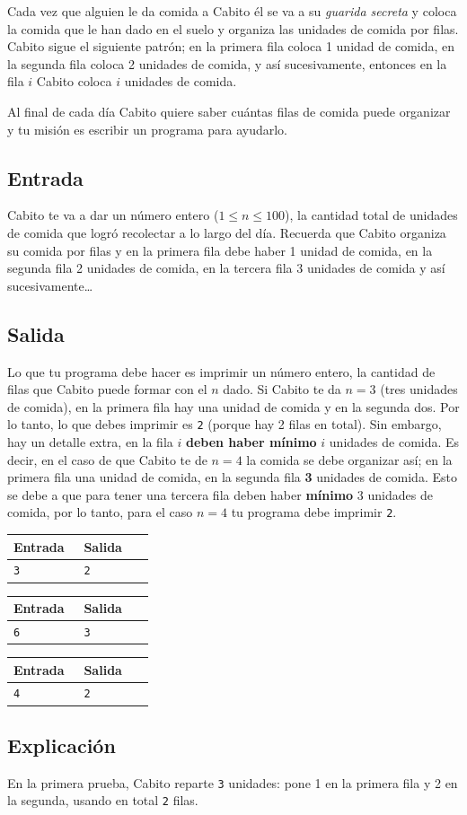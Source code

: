 \documentclass[10pt,letterpaper]{article}
\newcommand{\inputsection}{
  \subsection*{Entrada}
}
\newcommand{\outputsection}{
  \subsection*{Salida}
}
\newcommand{\explanation}{
  \subsection*{Explicación}
}
\newenvironment{sample}[2]{
  \begin{tcolorbox}[title=Prueba \##1, colback=white, colframe=black, sharp corners,
    fonttitle=\bfseries, breakable]
    \begin{tabular}{|p{0.45\linewidth}|p{0.45\linewidth}|}
      \hline
      \textbf{Entrada} & \textbf{Salida} \\
      \hline
      }{\\ \hline
    \end{tabular}
  \end{tcolorbox}
}
\begin{document}
Cada vez que alguien le da comida a Cabito él se va a su \textit{guarida secreta} y coloca la comida que le han dado en el suelo y organiza las unidades de comida por filas. Cabito sigue el siguiente patrón; en la primera fila coloca 1 unidad de comida, en la segunda fila coloca 2 unidades de comida, y así sucesivamente, entonces en la fila \(i\) Cabito coloca \(i\) unidades de comida.

Al final de cada día Cabito quiere saber cuántas filas de comida puede organizar y tu misión es escribir un programa para ayudarlo.

\inputsection

Cabito te va a dar un número entero (\(1 \leq n \leq 100\)), la cantidad total de unidades de comida que logró recolectar a lo largo del día. Recuerda que Cabito organiza su comida por filas y en la primera fila debe haber 1 unidad de comida, en la segunda fila 2 unidades de comida, en la tercera fila 3 unidades de comida y así sucesivamente\ldots

\outputsection


Lo que tu programa debe hacer es imprimir un número entero, la cantidad de filas que Cabito puede formar con el \(n\) dado. Si Cabito te da \(n = 3\) (tres unidades de comida), en la primera fila hay una unidad de comida y en la segunda dos. Por lo tanto, lo que debes imprimir es \texttt{2} (porque hay 2 filas en total). Sin embargo, hay un detalle extra, en la fila \(i\) \textbf{deben haber mínimo} \(i\) unidades de comida. Es decir, en el caso de que Cabito te de \(n=4\) la comida se debe organizar así; en la primera fila una unidad de comida, en la segunda fila \textbf{3} unidades de comida. Esto se debe a que para tener una tercera fila deben haber \textbf{mínimo} 3 unidades de comida, por lo tanto, para el caso \(n = 4\) tu programa debe imprimir \texttt{2}.


\begin{sample}{1}{}
  \texttt{3}
  &
  \texttt{2}
\end{sample}

\begin{sample}{2}{}
  \texttt{6}
  &
  \texttt{3}
\end{sample}

\begin{sample}{3}{}
  \texttt{4}
  &
  \texttt{2}
\end{sample}

\explanation

En la primera prueba, Cabito reparte \texttt{3} unidades: pone 1 en la primera fila y 2 en la segunda, usando en total \texttt{2} filas.
\end{document}

